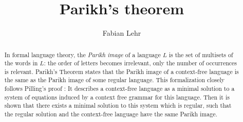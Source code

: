 \documentclass[11pt,a4paper]{article}
\begin{document}
\title{Parikh's theorem}
\author{Fabian Lehr}
\maketitle

\begin{abstract}
  In formal language theory, the \emph{Parikh image} of a language $L$
  is the set of multisets of the words in $L$: the order of letters
  becomes irrelevant, only the number of occurrences is relevant.
  Parikh's Theorem states that the Parikh image of a context-free
  language is the same as the Parikh image of some regular language.
  This formalization closely follows Pilling's proof \cite{Pilling}:
  It describes a context-free language as a minimal solution to a
  system of equations induced by a context free grammar for this
  language. Then it is shown that there exists a minimal solution
  to this system which is regular, such that the regular solution and the
  context-free language have the same Parikh image.
\end{abstract}

\tableofcontents





\end{document}
